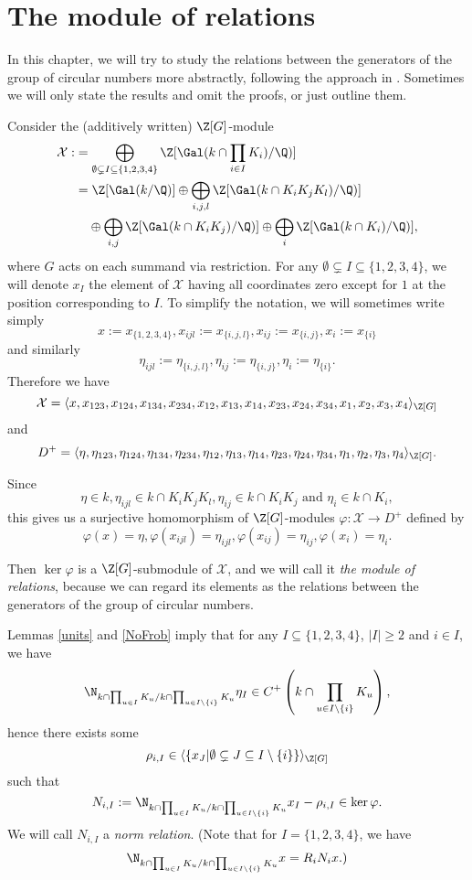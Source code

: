 \chapter{The module of relations}
In this chapter, we will try to study the relations between the generators of the group of circular numbers more abstractly, following the approach in \citep{Kucera2016}. Sometimes we will only state the results and omit the proofs, or just outline them.%

Consider the (additively written) $\Z[G]$-module
\begin{align*}
\mathcal{X}:&=\bigoplus_{\emptyset\subsetneq I \subseteq \{1,2,3,4\}} \Z[\Gal(k\cap \prod_{i\in I}K_i)/\Q)]\\
&=\Z[\Gal(k/\Q)] \oplus \bigoplus_{i,j,l} \Z[\Gal(k\cap K_iK_jK_l)/\Q)]\\
&\hphantom{{}=} \oplus \bigoplus_{i,j} \Z[\Gal(k\cap K_iK_j)/\Q)]\oplus \bigoplus_{i} \Z[\Gal(k\cap K_i)/\Q)],
\end{align*}
where $G$ acts on each summand via restriction. For any $\emptyset\subsetneq I \subseteq \{1,2,3,4\}$, we will denote $x_I$ the element of $\mathcal{X}$ having all coordinates zero except for $1$ at the position corresponding to $I$. To simplify the notation, we will sometimes write simply $$x:=x_{\{1,2,3,4\}},x_{ijl}:=x_{\{i,j,l\}},x_{ij}:=x_{\{i,j\}},x_{i}:=x_{\{i\}}$$ and similarly $$\eta_{ijl}:=\eta_{\{i,j,l\}},\eta_{ij}:=\eta_{\{i,j\}},\eta_{i}:=\eta_{\{i\}}.$$
Therefore we have 
$$\mathcal{X}=\langle x,x_{123},x_{124},x_{134},x_{234}, x_{12},x_{13},x_{14},x_{23},x_{24},x_{34},x_{1},x_{2},x_{3},x_{4}\rangle_{\Z[G]}$$
and
$$D^+=\langle \eta,\eta_{123},\eta_{124},\eta_{134},\eta_{234}, \eta_{12},\eta_{13},\eta_{14},\eta_{23},\eta_{24},\eta_{34},\eta_{1},\eta_{2},\eta_{3},\eta_{4}\rangle_{\Z[G]}.$$

Since $$\eta\in k, \eta_{ijl}\in k\cap K_iK_jK_l, \eta_{ij}\in k\cap K_iK_j \text{ and } \eta_{i}\in k\cap K_i,$$ this gives us a surjective homomorphism of $\Z[G]$-modules $\varphi:\mathcal{X}\to D^+$ defined by $$\varphi(x)=\eta, \varphi(x_{ijl})=\eta_{ijl}, \varphi(x_{ij})=\eta_{ij}, \varphi(x_{i})=\eta_{i}.$$

Then $\ker\varphi$ is a $\Z[G]$-submodule of $\mathcal{X}$, and we will call it \textit{the module of relations}, because we can regard its elements as the relations between the generators of the group of circular numbers.

Lemmas \ref{units} and \ref{NoFrob} imply that for any $I \subseteq \{1,2,3,4\}$, $|I|\geq 2$ and $i\in I$, we have
$$\N_{k\cap \prod_{u\in I}K_u/ k \cap \prod_{u\in I\setminus{\{i\}}}K_u} \eta_I\in C^+\left( k \cap \prod_{u\in I\setminus{\{i\}}}K_u\right),$$
hence there exists some $$\rho_{i,I}\in \langle \{x_J | \emptyset\subsetneq J \subseteq I \setminus{\{i\}} \}\rangle_{\Z[G]}$$
 such that $$N_{i,I}:=\N_{k\cap \prod_{u\in I}K_u/ k \cap \prod_{u\in I\setminus{\{i\}}}K_u}x_I-\rho_{i,I} \in \ker \varphi.$$
 We will call $N_{i,I}$ a \textit{norm relation}.
 (Note that for $I=\{1,2,3,4\}$, we have $$\N_{k\cap \prod_{u\in I}K_u/ k \cap \prod_{u\in I\setminus{\{i\}}}K_u}x=R_iN_i x.)$$

